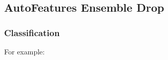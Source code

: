\documentclass[letterpaper,11pt,english]{sphinxmanual}
\begin{document}
\begin{figure}[htbp]
\centering

\noindent{}
\end{figure}

\begin{figure}[htbp]
\centering

\noindent{}
\end{figure}


\subsection{AutoFeatures  Ensemble Drop}
\label{\detokenize{demo:autofeatures-ensemble-drop}}

\subsubsection{Classification}
\label{\detokenize{demo:classification}}
For example:
\end{document}

